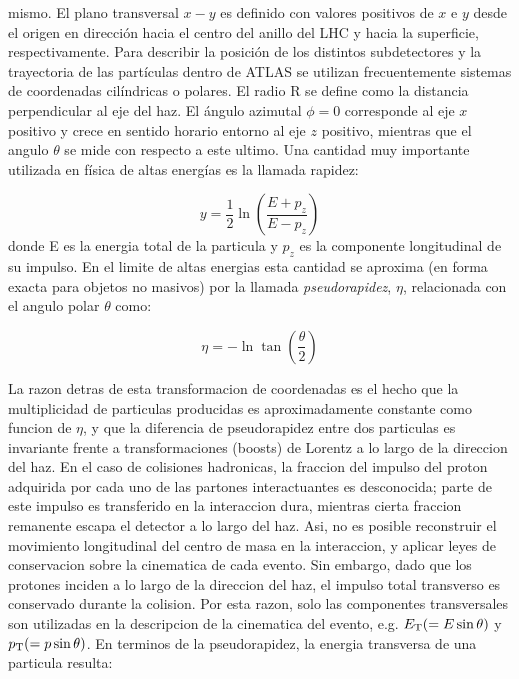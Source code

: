 mismo. El plano transversal $x-y$ es definido con valores positivos de $x$ e $y$
desde el origen en dirección hacia el centro del anillo del LHC y hacia la
superficie, respectivamente. Para describir la posición de los distintos
subdetectores y la trayectoria de las partículas dentro de ATLAS se utilizan
frecuentemente sistemas de coordenadas cilíndricas o polares. El radio R se
define como la distancia perpendicular al eje del haz. El ángulo azimutal $\phi
= 0$ corresponde al eje $x$ positivo y crece en sentido horario entorno al eje
$z$ positivo, mientras que el angulo $\theta$ se mide con respecto a este
ultimo. Una cantidad muy importante utilizada en física de altas energías es la
llamada rapidez:

\begin{equation}
  y = \frac{1}{2} \ln \left( \frac{E+p_z}{E-p_z} \right)
\end{equation}
%
donde E es la energia total de la particula y $p_z$ es la componente
longitudinal de su impulso. En el limite de altas energias esta cantidad se
aproxima (en forma exacta para objetos no masivos) por la llamada
\emph{pseudorapidez}, $\eta$, relacionada con el angulo polar $\theta$ como:

\begin{equation}
  \eta = - \ln \tan \left( \frac{\theta}{2} \right)
\end{equation}

La razon detras de esta transformacion de coordenadas es el hecho que la
multiplicidad de particulas producidas es aproximadamente constante como funcion
de $\eta$, y que la diferencia de pseudorapidez entre dos particulas es
invariante frente a transformaciones (boosts) de Lorentz a lo largo de la
direccion del haz. En el caso de colisiones hadronicas, la fraccion del impulso
del proton adquirida por cada uno de las partones interactuantes es desconocida;
parte de este impulso es transferido en la interaccion dura, mientras cierta
fraccion remanente escapa el detector a lo largo del haz. Asi, no es posible
reconstruir el movimiento longitudinal del centro de masa en la interaccion, y
aplicar leyes de conservacion sobre la cinematica de cada evento. Sin embargo,
dado que los protones inciden a lo largo de la direccion del haz, el impulso
total transverso es conservado durante la colision. Por esta razon, solo las
componentes transversales son utilizadas en la descripcion de la cinematica del
evento, e.g. $E_{\mathrm{T}} (= E \sin \theta)$ y $p_{\mathrm{T}} (= p \sin \theta)$. En terminos de
la pseudorapidez, la energia transversa de una particula resulta:


